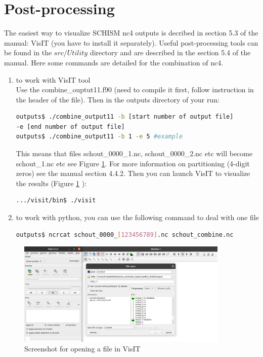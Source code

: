 \documentclass[preprints,briefreport,accept,oneauthor,pdftex]{Definitions/mdpi}
\begin{document}
\section{Post-processing}
\noindent The easiest way to visualize SCHISM nc4 outputs is decribed in section 5.3 of the manual: VisIT (you have to install it separately). Useful post-processing tools can be found in the $src/Utility$ directory and are described in the section 5.4 of the manual. Here some commands are detailed for the combination of nc4.
\begin{enumerate}
  \item to work with VisIT tool\\
Use the combine\_ouptut11.f90 (need to compile it first, follow instruction in the header of the file). Then in the outputs directory of your run:
\begin{lstlisting}[language=bash]
outputs$ ./combine_output11 -b [start number of output file] 
-e [end number of output file] 
outputs$ ./combine_output11 -b 1 -e 5 #example
\end{lstlisting}
This means that files schout\_0000\_1.nc, schout\_0000\_2.nc etc will become schout\_1.nc etc see Figure \ref{fig:visit}. For more information on partitioning (4-digit zeros) see the manual section 4.4.2. Then you can launch VisIT to visualize the results (Figure \ref{fig:visit} ):
\begin{lstlisting}[language=bash]
.../visit/bin$ ./visit
\end{lstlisting}
    \item to work with python, you can use the following command to deal with one file
\begin{lstlisting}[language=bash] 
outputs$ ncrcat schout_0000_[123456789].nc schout_combine.nc
\end{lstlisting}
\end{enumerate}
\begin{figure}[htbp]
    \centering
    \includegraphics[width=0.9\textwidth]{figures/visitgood.png}
    \caption{Screenshot for opening a file in VisIT}
    \label{fig:visit}
\end{figure}
\end{document}

